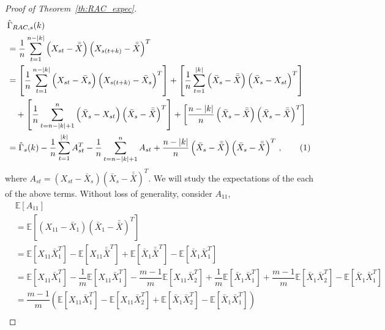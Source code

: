 \documentclass[11pt]{article}
\newcommand{\E}{\mathbb{E}}
\newcommand\numberthis{\addtocounter{equation}{1}\tag{\theequation}}
\theoremstyle{remark}
\begin{document}
\begin{proof}[Proof of Theorem~\ref{th:RAC_expec}]
\begin{align*}
    & \hat{\Gamma}_{RAC,s}(k) \\
   & = \dfrac{1}{n}\sum_{t=1}^{n-|k|} \left(X_{st} - \bar{\bar{X}} \right) \left(X_{s(t+k)} - \bar{\bar{X}} \right)^T \\
    &= \left[\dfrac{1}{n} \sum_{t=1}^{n-|k|} \left(X_{st} - \bar{X}_s \right) \left(X_{s(t+k)} - \bar{X}_s \right)^T \right] + \left[\dfrac{1}{n} \sum_{t=1}^{|k|} \left(\bar{X}_s - \bar{\bar{X}} \right)  \left(\bar{X}_s - X_{st} \right)^T\right] \\ 
    & \quad +  \left[\dfrac{1}{n} \sum_{t=n-|k|+1}^{n}  \left( \bar{X}_s - X_{st} \right)  \left(\bar{X}_s - \bar{\bar{X}} \right)^T\right] + \left[\dfrac{n-|k|}{n} \left(\bar{X}_s - \bar{\bar{X}}\right)   \left(\bar{X}_s - \bar{\bar{X}} \right)^T\right]\\
    &= \hat{\Gamma}_s(k) - \dfrac{1}{n} \sum_{t=1}^{|k|}A_{st}^T - \dfrac{1}{n}\sum_{t=n-|k|+1}^{n}A_{st} + \dfrac{n-|k|}{n}  \left(\bar{X}_s - \bar{\bar{X}} \right)  \left(\bar{X}_s - \bar{\bar{X}} \right)^T\,, \numberthis \label{eq:acf_breakdown}
\end{align*}
%
where $A_{st} = (X_{st}-\bar{X}_s)(\bar{X}_s - \bar{\bar{X}})^T$. We will study the expectations of the each of the above terms. Without loss of generality, consider $A_{11}$,
\begin{align*}
    &\E \left[A_{11} \right]\\
     &= \mathbb{E} \left[ \left(X_{11} - \bar{X}_1 \right) \left(\bar{X}_1 - \bar{\bar{X}} \right)^T \right]\\
     &= \mathbb{E} \left[X_{11}\bar{X}_1^T \right] - \mathbb{E}\left[X_{11}\bar{\bar{X}}^T \right] + \mathbb{E} \left[\bar{X}_1\bar{\bar{X}}^T \right] - \mathbb{E} \left[\bar{X}_1\bar{X}_1^T \right]\\
    &= \mathbb{E} \left[X_{11}\bar{X}_1^T \right] - \dfrac{1}{m}\mathbb{E} \left[X_{11}\bar{X}_1^T \right] - \dfrac{m-1}{m}\mathbb{E} \left[X_{11}\bar{X}_2^T \right] + \dfrac{1}{m}\mathbb{E} \left[\bar{X}_1\bar{X}_1^T \right] + \dfrac{m-1}{m}\mathbb{E} \left[\bar{X}_1\bar{X}_2^T \right] - \mathbb{E} \left[\bar{X}_1\bar{X}_1^T \right]\\
    &= \dfrac{m-1}{m}\left(\mathbb{E} \left[X_{11}\bar{X}_1^T \right] - \mathbb{E} \left[X_{11}\bar{X}_2^T \right] + \mathbb{E} \left[\bar{X}_1\bar{X}_2^T \right] - \mathbb{E} \left[\bar{X}_1\bar{X}_1^T \right]\right)\\

\end{align*}
\end{proof}
\end{document}
